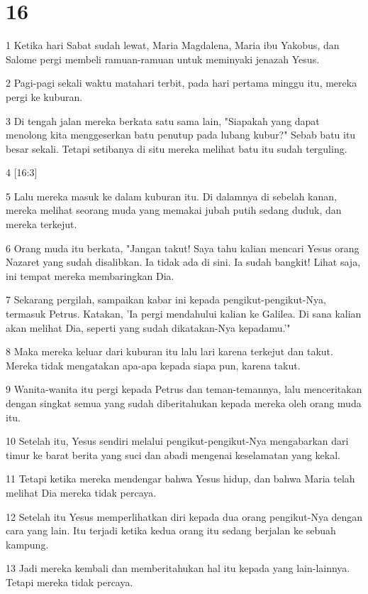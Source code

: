 \chapter{16}

\par 1 Ketika hari Sabat sudah lewat, Maria Magdalena, Maria ibu Yakobus, dan Salome pergi membeli ramuan-ramuan untuk meminyaki jenazah Yesus.
\par 2 Pagi-pagi sekali waktu matahari terbit, pada hari pertama minggu itu, mereka pergi ke kuburan.
\par 3 Di tengah jalan mereka berkata satu sama lain, "Siapakah yang dapat menolong kita menggeserkan batu penutup pada lubang kubur?" Sebab batu itu besar sekali. Tetapi setibanya di situ mereka melihat batu itu sudah terguling.
\par 4 [16:3]
\par 5 Lalu mereka masuk ke dalam kuburan itu. Di dalamnya di sebelah kanan, mereka melihat seorang muda yang memakai jubah putih sedang duduk, dan mereka terkejut.
\par 6 Orang muda itu berkata, "Jangan takut! Saya tahu kalian mencari Yesus orang Nazaret yang sudah disalibkan. Ia tidak ada di sini. Ia sudah bangkit! Lihat saja, ini tempat mereka membaringkan Dia.
\par 7 Sekarang pergilah, sampaikan kabar ini kepada pengikut-pengikut-Nya, termasuk Petrus. Katakan, 'Ia pergi mendahului kalian ke Galilea. Di sana kalian akan melihat Dia, seperti yang sudah dikatakan-Nya kepadamu.'"
\par 8 Maka mereka keluar dari kuburan itu lalu lari karena terkejut dan takut. Mereka tidak mengatakan apa-apa kepada siapa pun, karena takut.
\par 9 Wanita-wanita itu pergi kepada Petrus dan teman-temannya, lalu menceritakan dengan singkat semua yang sudah diberitahukan kepada mereka oleh orang muda itu.
\par 10 Setelah itu, Yesus sendiri melalui pengikut-pengikut-Nya mengabarkan dari timur ke barat berita yang suci dan abadi mengenai keselamatan yang kekal.
\par 11 Tetapi ketika mereka mendengar bahwa Yesus hidup, dan bahwa Maria telah melihat Dia mereka tidak percaya.
\par 12 Setelah itu Yesus memperlihatkan diri kepada dua orang pengikut-Nya dengan cara yang lain. Itu terjadi ketika kedua orang itu sedang berjalan ke sebuah kampung.
\par 13 Jadi mereka kembali dan memberitahukan hal itu kepada yang lain-lainnya. Tetapi mereka tidak percaya.

